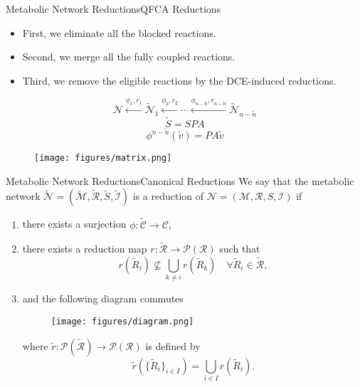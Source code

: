 \documentclass[10pt]{beamer}
\theoremstyle{remark}
\theoremstyle{definition}
\begin{document}
\begin{frame}{Metabolic Network Reductions}{QFCA Reductions}
\noindent
\begin{minipage}[t]{.49\textwidth}
\raggedright
	\begin{itemize}
		\item<1-> First, we eliminate all the blocked reactions.
		\item<2-> Second, we merge all the fully coupled reactions.
		\item<3-> Third, we remove the eligible reactions by the DCE-induced reductions.
	\end{itemize}
	\pause
	\pause
	\pause
	\begin{block}{}
	\[
	\mathcal{N}\xleftarrow{\phi_1,r_1}\tilde{\mathcal{N}}_1\xleftarrow{\phi_2,r_2}\cdots
	\xleftarrow{\phi_{n-\tilde{n}},r_{n-\tilde{n}}}\tilde{\mathcal{N}}_{n-\tilde{n}}
	\]
	\[
	\tilde{S} = SPA
	\]
	\[
	\phi^{n-\tilde{n}}(\tilde{v})=PA\tilde{v}
	\]
	\end{block}
\end{minipage}
\hfill
\begin{minipage}[t]{.49\textwidth}
\raggedleft
\begin{figure}[ht]%
    \centering
    \texttt{[image: figures/matrix.png]}
\end{figure}
\end{minipage}

\end{frame}

\begin{frame}{Metabolic Network Reductions}{Canonical Reductions}
We say that the metabolic network 
$\tilde{\mathcal{N}}=(\tilde{\mathcal{M}}, \tilde{\mathcal{R}}, \tilde{S}, \tilde{\mathcal{I}})$ 
is a reduction of $\mathcal{N}=(\mathcal{M}, \mathcal{R}, S, \mathcal{I})$ if 
\begin{enumerate}
	\item<2-> there exists a surjection $\phi:\tilde{\mathcal{C}}\rightarrow \mathcal{C}$,
	\item<3-> there exists a reduction map $r:\tilde{\mathcal{R}}\rightarrow\mathcal{P}(\mathcal{R})$ such 
	that 
	\[
	r(\tilde{R}_i) \nsubseteq \bigcup_{k\neq i}r(\tilde{R}_k)\quad\forall\tilde{R}_i\in\tilde{\mathcal{R}},
	\]
	\item<4-> and the following diagram commutes
	\begin{figure}[ht]
    \centering
    \texttt{[image: figures/diagram.png]}
	\end{figure}
	where $\tilde{r}:\mathcal{P}(\tilde{\mathcal{R}})\rightarrow\mathcal{P}(\mathcal{R})$ is defined by 
	\[
	\tilde{r}(\{\tilde{R}_i\}_{i\in I}) = \bigcup_{i\in I} r(\tilde{R}_i).
	\]
\end{enumerate}
\end{frame}
\end{document}
